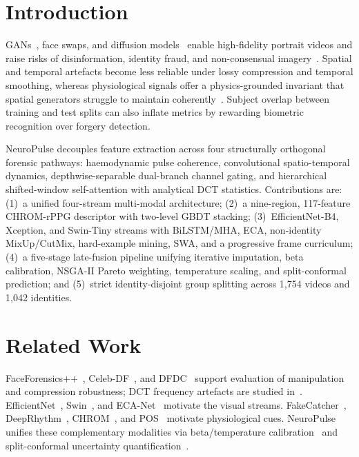 \documentclass[runningheads]{llncs}
\begin{document}
\section{Introduction}
GANs~\cite{goodfellow2014gan}, face swaps, and diffusion models~\cite{ho2020ddpm} enable high-fidelity portrait videos and raise risks of disinformation, identity fraud, and non-consensual imagery~\cite{li2020celebdf,rossler2019ff}. Spatial and temporal artefacts become less reliable under lossy compression and temporal smoothing, whereas physiological signals offer a physics-grounded invariant that spatial generators struggle to maintain coherently~\cite{ciftci2020fakecatcher}. Subject overlap between training and test splits can also inflate metrics by rewarding biometric recognition over forgery detection.

NeuroPulse decouples feature extraction across four structurally orthogonal forensic pathways: haemodynamic pulse coherence, convolutional spatio-temporal dynamics, depthwise-separable dual-branch channel gating, and hierarchical shifted-window self-attention with analytical DCT statistics. Contributions are: (1)~a unified four-stream multi-modal architecture; (2)~a nine-region, 117-feature CHROM-rPPG descriptor with two-level GBDT stacking; (3)~EfficientNet-B4, Xception, and Swin-Tiny streams with BiLSTM/MHA, ECA, non-identity MixUp/CutMix, hard-example mining, SWA, and a progressive frame curriculum; (4)~a five-stage late-fusion pipeline unifying iterative imputation, beta calibration, NSGA-II Pareto weighting, temperature scaling, and split-conformal prediction; and (5)~strict identity-disjoint group splitting across 1,754 videos and 1,042 identities.

\section{Related Work}
FaceForensics++~\cite{chollet2017xception,rossler2019ff}, Celeb-DF~\cite{li2020celebdf}, and DFDC~\cite{dolhansky2020dfdc} support evaluation of manipulation and compression robustness; DCT frequency artefacts are studied in~\cite{frank2020leveraging}. EfficientNet~\cite{tan2019efficientnet}, Swin~\cite{liu2021swin}, and ECA-Net~\cite{wang2020eca} motivate the visual streams. FakeCatcher~\cite{ciftci2020fakecatcher}, DeepRhythm~\cite{qi2020deeprhythm}, CHROM~\cite{dehaan2013chrom}, and POS~\cite{wang2017pos} motivate physiological cues. NeuroPulse unifies these complementary modalities via beta/temperature calibration~\cite{guo2017calibration,kull2017beta} and split-conformal uncertainty quantification~\cite{vovk2005conformal}.
\end{document}
